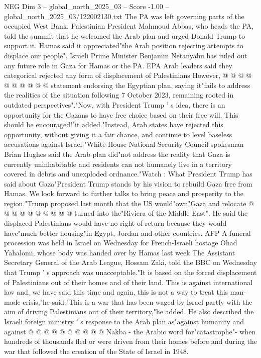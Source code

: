 \begin{textsample}{NEG Dim 3 – global\_north\_2025\_03 – Score -1.00 – global\_north\_2025\_03/122002130.txt}
The PA was left governing parts of the occupied West Bank.
Palestinian President Mahmoud Abbas, who heads the PA, told the summit that he welcomed the Arab plan and urged Donald Trump to support it.
Hamas said it appreciated"the Arab position rejecting attempts to displace our people".
Israeli Prime Minister Benjamin Netanyahu has ruled out any future role in Gaza for Hamas or the PA.
EPA Arab leaders said they categorical rejected any form of displacement of Palestinians However, @ @ @ @ @ @ @ @ @ @ statement endorsing the Egyptian plan, saying it"fails to address the realities of the situation following 7 October 2023, remaining rooted in outdated perspectives"."Now, with President Trump ' s idea, there is an opportunity for the Gazans to have free choice based on their free will.
This should be encouraged!"it added."Instead, Arab states have rejected this opportunity, without giving it a fair chance, and continue to level baseless accusations against Israel."White House National Security Council spokesman Brian Hughes said the Arab plan did"not address the reality that Gaza is currently uninhabitable and residents can not humanely live in a territory covered in debris and unexploded ordnance."Watch : What President Trump has said about Gaza"President Trump stands by his vision to rebuild Gaza free from Hamas.
We look forward to further talks to bring peace and prosperity to the region."Trump proposed last month that the US would"own"Gaza and relocate @ @ @ @ @ @ @ @ @ @ turned into the"Riviera of the Middle East".
He said the displaced Palestinians would have no right of return because they would have"much better housing"in Egypt, Jordan and other countries.
AFP A funeral procession was held in Israel on Wednesday for French-Israeli hostage Ohad Yahalomi, whose body was handed over by Hamas last week The Assistant Secretary General of the Arab League, Hossam Zaki, told the BBC on Wednesday that Trump ' s approach was unacceptable."It is based on the forced displacement of Palestinians out of their homes and of their land.
This is against international law and, we have said this time and again, this is not a way to treat this man-made crisis,"he said."This is a war that has been waged by Israel partly with the aim of driving Palestinians out of their territory,"he added.
He also described the Israeli foreign ministry ' s response to the Arab plan as"against humanity and against @ @ @ @ @ @ @ @ @ @ Nakba - the Arabic word for"catastrophe"- when hundreds of thousands fled or were driven from their homes before and during the war that followed the creation of the State of Israel in 1948.

\end{textsample}
